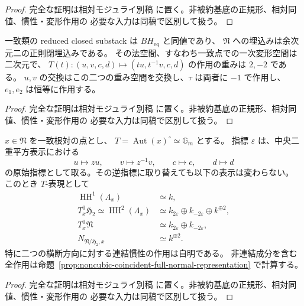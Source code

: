 \begin{proof}
完全な証明は相対モジュライ別稿
\cite[noncubic 境界の相対表示とモジュライ写像]{QuadricModuli2026}
に置く。非被約基底の正規形、相対同値、慣性・変形作用の
必要な入力は同稿で区別して扱う。
\end{proof}

\begin{proposition}
\label{prop:noncubic-coincident-gerbe-tangent}
一致類の reduced closed substack は $BH_{\mathrm{eq}}$ と同値であり、
$\mathfrak N$ への埋込みは余次元二の正則閉埋込みである。
その法空間、すなわち一致点での一次変形空間は二次元で、
$T(t):(u,v,c,d)\mapsto(tu,t^{-1}v,c,d)$ の作用の重みは $2,-2$ である。
$u,v$ の交換はこの二つの重み空間を交換し、$\tau$ は両者に $-1$ で作用し、
$e_1,e_2$ は恒等に作用する。
\end{proposition}

\begin{proof}
完全な証明は相対モジュライ別稿
\cite[noncubic 境界の相対表示とモジュライ写像]{QuadricModuli2026}
に置く。非被約基底の正規形、相対同値、慣性・変形作用の
必要な入力は同稿で区別して扱う。
\end{proof}


\begin{proposition}[一致根対における連結慣性の接表現]
\label{prop:noncubic-coincident-torus-weights}
$x\in\mathfrak N$ を一致根対の点とし、
$T=\operatorname{Aut}(x)^\circ\simeq\mathbb G_m$ とする。
指標 $\varepsilon$ は、中央二重平方表示における
\[
 u\longmapsto z u,\qquad v\longmapsto z^{-1}v,
 \qquad c\longmapsto c,\qquad d\longmapsto d
\]
の原始指標として取る。その逆指標に取り替えても以下の表示は変わらない。
このとき $T$-表現として
\[
 \begin{split}
 \operatorname{HH}^1(\Lambda_x)&\simeq k,\\
 T^0_x\mathfrak H_2\simeq\operatorname{HH}^2(\Lambda_x)
   &\simeq k_{2\varepsilon}\oplus k_{-2\varepsilon}\oplus k^{\oplus2},\\
 T^0_x\mathfrak N&\simeq k_{2\varepsilon}\oplus k_{-2\varepsilon},\\
 N_{\mathfrak N/\mathfrak H_2,x}&\simeq k^{\oplus2}.
 \end{split}
\]
特に二つの横断方向に対する連結慣性の作用は自明である。
非連結成分を含む全作用は命題~\ref{prop:noncubic-coincident-full-normal-representation} で計算する。
\end{proposition}
\begin{proof}
完全な証明は相対モジュライ別稿
\cite[noncubic 境界の相対表示とモジュライ写像]{QuadricModuli2026}
に置く。非被約基底の正規形、相対同値、慣性・変形作用の
必要な入力は同稿で区別して扱う。
\end{proof}


